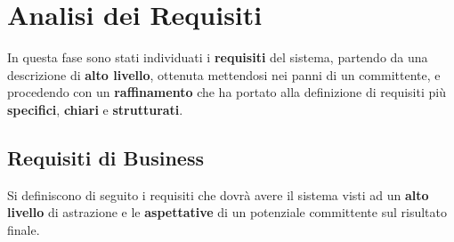 \chapter{Analisi dei Requisiti}
In questa fase sono stati individuati i \textbf{requisiti} del sistema, partendo da una descrizione di \textbf{alto livello}, ottenuta mettendosi nei panni di un committente, e procedendo con un \textbf{raffinamento} che ha portato alla definizione di requisiti più \textbf{specifici}, \textbf{chiari} e \textbf{strutturati}. 
  

	\section{Requisiti di Business}
	Si definiscono di seguito i requisiti che dovrà avere il sistema visti ad un \textbf{alto livello} di astrazione e le \textbf{aspettative} di un potenziale committente sul risultato finale.
